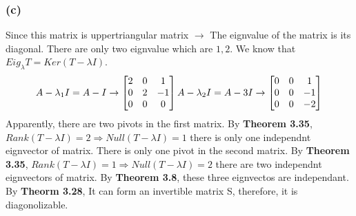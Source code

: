 \documentclass{article}
\begin{document}
\subsubsection*{(c)}
Since this matrix is uppertriangular matrix $\rightarrow$ The eignvalue of the matrix is its diagonal. There are only two eignvalue which are ${1, 2}$.
We know that $Eig _\lambda T = Ker(T - \lambda I)$. 
\begin{equation*}
    A - \lambda_1 I = A - I \rightarrow
    \begin {bmatrix}
    2 & 0 & 1\\
    0 & 2 & -1\\
    0 & 0 & 0
    \end {bmatrix} 
\\\\
    A - \lambda_2 I = A - 3I \rightarrow
    \begin {bmatrix}
    0 & 0 & 1\\
    0 & 0 & -1\\
    0 & 0 & -2
    \end {bmatrix}
\end{equation*}
Apparently, there are two pivots in the first matrix. By \textbf{Theorem 3.35}, $Rank(T - \lambda I) = 2 \Rightarrow Null(T - \lambda I) = 1$ there is only one independnt eignvector of
matrix. There is only one pivot in the second matrix. By \textbf{Theorem 3.35}, $Rank(T - \lambda I) = 1 \Rightarrow Null(T - \lambda I) = 2$ there are two independnt eignvectors of
matrix. By \textbf{Theorem 3.8}, these three eignvectos are independant. By \textbf{Theorm 3.28}, It can form an invertible matrix S, therefore, it is diagonolizable.
\end{document}
